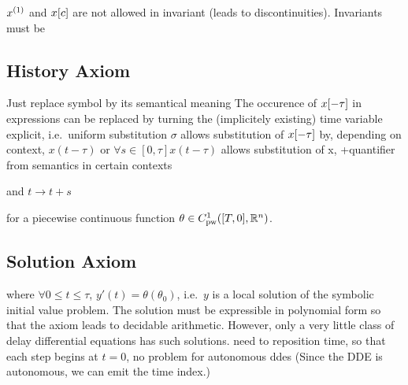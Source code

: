         $\D{x}$ and $x[c]$ are not allowed in invariant (leads to discontinuities). Invariants must be \FOLR

    \subsection{History Axiom}
        \label{history-axiom}

        Just replace symbol by its semantical meaning
        The occurence of $x[-\tau]$ in expressions can be replaced by turning the (implicitely existing) time variable explicit, i.e.\
        uniform substitution $\sigma$
        allows substitution of $x[-\tau]$ by, depending on context, $x(t-\tau)$ or $\forall{s\in[0,\tau]}{x(t-\tau)}$
        allows substitution of x, +quantifier from semantics in certain contexts

        \begin{calculus}
        \end{calculus}

        and $t\rightarrow t+s$

        for a piecewise continuous function $\theta\in\statespace$.

    \subsection{Solution Axiom}
        \label{sec:solution-axiom}

        \begin{calculus}
        \end{calculus}

        where $\forall 0\leq t\leq\tau$, $y'(t)=\theta(\theta_0)$, i.e.\ $y$ is a local solution of the symbolic initial value problem. The solution must be expressible in polynomial form so that the axiom leads to decidable arithmetic.
        However, only a very little class of delay differential equations has such solutions.
        need to reposition time, so that each step begins at $t=0$, no problem for autonomous ddes
        (Since the DDE is autonomous, we can emit the time index.)

